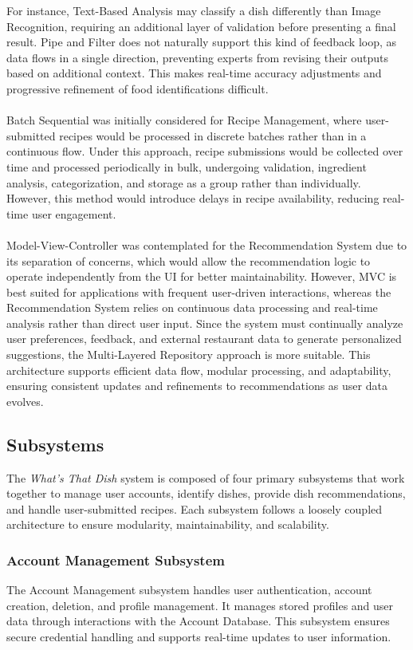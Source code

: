 \documentclass[]{article}
\begin{document}
For instance, Text-Based Analysis may classify a dish differently than Image Recognition, requiring an additional layer of validation before presenting a final result. 
Pipe and Filter does not naturally support this kind of feedback loop, as data flows in a single direction, preventing experts from revising their outputs based on additional context.
This makes real-time accuracy adjustments and progressive refinement of food identifications difficult.
\\
\\
Batch Sequential was initially considered for Recipe Management, where user-submitted recipes would be processed in discrete batches rather than in a continuous flow. 
Under this approach, recipe submissions would be collected over time and processed periodically in bulk, undergoing validation, ingredient analysis, categorization, and storage as a group rather than individually. 
However, this method would introduce delays in recipe availability, reducing real-time user engagement. 
\\
\\
Model-View-Controller was contemplated for the Recommendation System due to its separation of concerns, which would allow the recommendation logic to operate independently from the UI for better maintainability.
However, MVC is best suited for applications with frequent user-driven interactions, whereas the Recommendation System relies on continuous data processing and real-time analysis rather than direct user input. 
Since the system must continually analyze user preferences, feedback, and external restaurant data to generate personalized suggestions, the Multi-Layered Repository approach is more suitable. 
This architecture supports efficient data flow, modular processing, and adaptability, ensuring consistent updates and refinements to recommendations as user data evolves.

\subsection{Subsystems}
\label{sub:subsystems}

The \textit{What’s That Dish} system is composed of four primary subsystems that work together to manage user accounts, identify dishes, provide dish recommendations, and handle user-submitted recipes. Each subsystem follows a loosely coupled architecture to ensure modularity, maintainability, and scalability.

\subsubsection{Account Management Subsystem}
The Account Management subsystem handles user authentication, account creation, deletion, and profile management. It manages stored profiles and user data through interactions with the Account Database. This subsystem ensures secure credential handling and supports real-time updates to user information.
\end{document}

